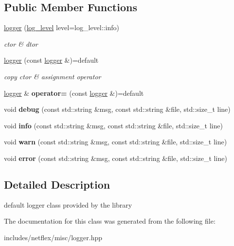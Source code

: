 \subsection*{Public Member Functions}
\begin{DoxyCompactItemize}
\item 
\mbox{\label{classnetflex_1_1logger_a8ed6f964305456a251c83761d5da70a7}} 
\hyperlink{classnetflex_1_1logger_a8ed6f964305456a251c83761d5da70a7}{logger} (\hyperlink{classnetflex_1_1logger_a8270276b1351480a8a9bfab4139cdc9c}{log\+\_\+level} level=log\+\_\+level\+::info)
\begin{DoxyCompactList}\small\item\em ctor \& dtor \end{DoxyCompactList}\item 
\mbox{\label{classnetflex_1_1logger_ac4f3c65364cfc45034cec215d518afdf}} 
\hyperlink{classnetflex_1_1logger_ac4f3c65364cfc45034cec215d518afdf}{logger} (const \hyperlink{classnetflex_1_1logger}{logger} \&)=default
\begin{DoxyCompactList}\small\item\em copy ctor \& assignment operator \end{DoxyCompactList}\item 
\mbox{\label{classnetflex_1_1logger_ac709fc0f8713f94795031e555fab7afb}} 
\hyperlink{classnetflex_1_1logger}{logger} \& {\bfseries operator=} (const \hyperlink{classnetflex_1_1logger}{logger} \&)=default
\item 
\mbox{\label{classnetflex_1_1logger_a6acb4c370bbacf855ec9e039defdb39c}} 
void {\bfseries debug} (const std\+::string \&msg, const std\+::string \&file, std\+::size\+\_\+t line)
\item 
\mbox{\label{classnetflex_1_1logger_a5663c09b0fddff8efcc8556bc600bff4}} 
void {\bfseries info} (const std\+::string \&msg, const std\+::string \&file, std\+::size\+\_\+t line)
\item 
\mbox{\label{classnetflex_1_1logger_a0874f423d630a7263fd89ce6a2e3c2f9}} 
void {\bfseries warn} (const std\+::string \&msg, const std\+::string \&file, std\+::size\+\_\+t line)
\item 
\mbox{\label{classnetflex_1_1logger_a1692266cfb80ea4e1f77f4d28a377875}} 
void {\bfseries error} (const std\+::string \&msg, const std\+::string \&file, std\+::size\+\_\+t line)
\end{DoxyCompactItemize}


\subsection{Detailed Description}
default logger class provided by the library 

The documentation for this class was generated from the following file\+:\begin{DoxyCompactItemize}
\item 
includes/netflex/misc/logger.\+hpp\end{DoxyCompactItemize}
